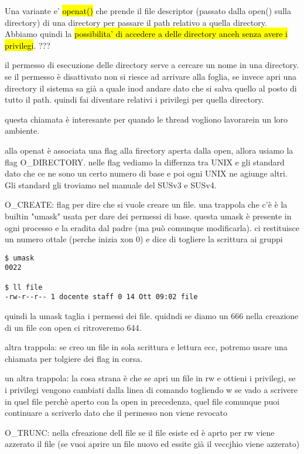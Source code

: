 Una variante e' \hl{openat()} che prende il file descriptor (passato dalla open() sulla directory) di una directory per passare il path relativo a quella directory. Abbiamo quindi la \hl{possibilita' di accedere a delle directory anceh senza avere i privilegi}. ???

il permesso di esecuzione delle directory serve a cercare un nome in una directory. se il permesso è disattivato non si riesce ad arrivare alla foglia, se invece apri una directory il sistema sa già a quale inod andare dato che si salva quello al posto di tutto il path. quindi fai diventare relativi i privilegi per quella directory. 

questa chiamata è interesante per quando le thread vogliono lavorarein un loro ambiente.

alla openat è associata una flag alla firectory aperta dalla open, allora usiamo la flag O\_DIRECTORY. nelle flag vediamo la differnza tra UNIX e gli standard dato che ce ne sono un certo numero di base e poi ogni UNIX ne agiunge altri. Gli standard gli troviamo nel manuale del SUSv3 e SUSv4.

O\_CREATE: flag per dire che si vuole creare un file. una trappola che c'è è la builtin "umask" usata per dare dei permessi di base. questa umask è presente in ogni processo e la eradita dal padre (ma può comunque modificarla). ci restituisce un numero ottale (perche inizia xon 0) e dice di togliere la scrittura ai gruppi

\begin{lstlisting}
$ umask
0022

$ ll file
-rw-r--r-- 1 docente staff 0 14 Ott 09:02 file
\end{lstlisting}

quindi la umask taglia i permessi dei file. quidndi se diamo un 666 nella creazione di un file con open ci ritroveremo 644.

altra trappola: se creo un file in sola scrittura e lettura ecc, potremo usare una chiamata per tolgiere dei flag in corsa. 


un altra trappola: la cosa strana è che se apri un file in rw e ottieni i privilegi, se i privilegi vengono cambiati dalla linea di comando togliendo w se vado a scrivere in quel file perchè aperto con la open in precedenza, quel file comunque puoi continuare a scriverlo dato che il permesso non viene revocato


O\_TRUNC: nella cfreazione dell file se il file esiste ed è aprto per rw viene azzerato il file (se vuoi aprire un file nuovo ed essite già il veccjhio viene azzerato)

